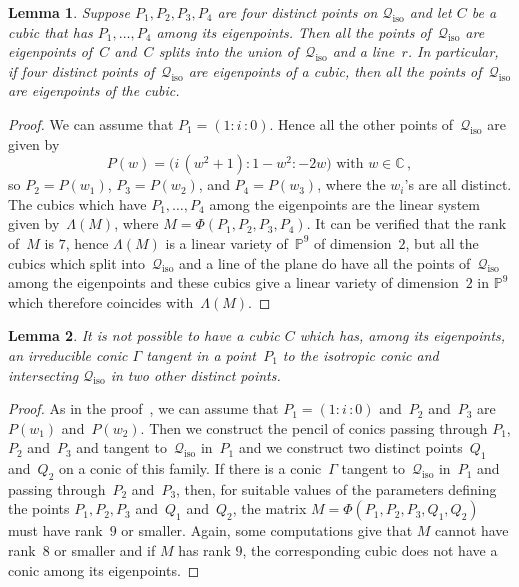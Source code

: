 \documentclass[a4paper, 11pt, reqno]{amsart}
\theoremstyle{plain}
\newtheorem{lemma}{Lemma}[section]
\theoremstyle{definition}
\newcommand{\C}{\mathbb{C}}
\newcommand{\p}{\mathbb{P}}
\newcommand{\iii}{\textit{i}\,}
\newcommand{\iso}{\mathcal{Q}_{\mathrm{iso}}}
\begin{document}
\begin{lemma}
\label{lemma:fourOnIso}
Suppose $P_1, P_2, P_3, P_4$ are four distinct points on $\iso$ and let
$C$ be a cubic that has $P_1, \dots, P_4$ among its eigenpoints.
Then all the points of~$\iso$ are eigenpoints of~$C$ 
and~$C$ splits into the union of~$\iso$ and a line~$r$.
In particular, if four distinct points of~$\iso$ are eigenpoints of a cubic,
then all the points of~$\iso$ are eigenpoints of the cubic.
\end{lemma}
\begin{proof}
We can assume that $P_1 = (1: \iii: 0)$. Hence all the other points
of~$\iso$ are given by
%
\[
  P(w) = \bigl(\iii(w^2 + 1): 1 - w^2: -2w\bigr) \text{ with } w \in \C \,,
\]
%
so $P_2 = P(w_1)$, $P_3 = P(w_2)$, and $P_4 = P(w_3)$, where the $w_i$'s are
all distinct. The cubics which have $P_1, \dots, P_4$ among the eigenpoints
are the linear system given by~$\Lambda (M)$, where $M = \Phi(P_1, P_2, P_3, P_4)$.
It can be verified that the rank of~$M$ is $7$, hence $\Lambda(M)$ is a linear variety of~$\p^9$ of dimension~$2$, but all the cubics which split into~$\iso$ and a line
of the plane do have all the points of~$\iso$ among the eigenpoints and
these cubics give a linear variety of dimension~$2$ in $\p^9$
which therefore coincides with~$\Lambda(M)$.
\end{proof}

\begin{lemma}
\label{lemma3ptiSuCiso}
It is not possible to have a cubic $C$ which has, among its eigenpoints,
an irreducible conic $\Gamma$ tangent in a point~$P_1$ to the isotropic
conic and intersecting $\iso$ in two other distinct points.
\end{lemma}
\begin{proof}
As in the proof~, we can assume that
$P_1 = (1: \iii: 0)$
and~$P_2$ and~$P_3$ are $P(w_1)$ and~$P(w_2)$. Then we construct
the pencil of conics passing through $P_1$, $P_2$ and~$P_3$ and
tangent to~$\iso$ in~$P_1$ and we construct two distinct points~$Q_1$ and~$Q_2$ on a conic of this family. If there is a conic~$\Gamma$
tangent to~$\iso$ in~$P_1$ and passing through~$P_2$ and~$P_3$,
then, for suitable values of the parameters defining the points
$P_1, P_2, P_3$ and~$Q_1$ and~$Q_2$, the matrix
$M = \Phi(P_1, P_2, P_3, Q_1, Q_2)$
must have rank~$9$ or smaller. Again, 
some computations give that $M$ cannot 
have rank~$8$ or smaller and if $M$ has rank $9$, the corresponding cubic 
does not have a conic among its eigenpoints.
\end{proof}
\end{document}
